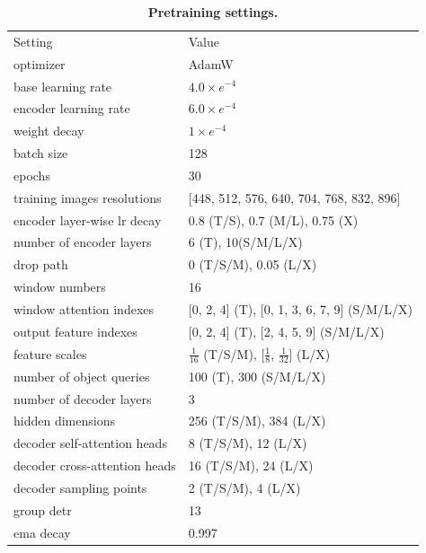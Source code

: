 \documentclass[runningheads]{llncs}
\begin{document}
\begin{table}
  \centering
    \setlength{\tabcolsep}{3.2pt}
    \renewcommand{\arraystretch}{1.41}
    \tiny
  \caption{\textbf{Pretraining settings.}}
  \vspace{-3mm}
  \begin{tabular}{l|l}
    Setting  & Value\\
    \shline
    optimizer & AdamW \\
    base learning rate & $4.0\times e^{-4}$ \\
    encoder learning rate & $6.0\times e^{-4}$ \\
    weight decay & $1\times e^{-4}$ \\
    batch size & 128 \\
    epochs & 30 \\
    training images resolutions & [448, 512, 576, 640, 704, 768, 832, 896] \\
    encoder layer-wise lr decay & 0.8 (T/S), 0.7 (M/L), 0.75 (X) \\
    number of encoder layers & 6 (T), 10(S/M/L/X) \\
    drop path & 0 (T/S/M), 0.05 (L/X) \\
    window numbers & 16 \\
    window attention indexes & [0, 2, 4] (T), [0, 1, 3, 6, 7, 9] (S/M/L/X) \\
    output feature indexes & [0, 2, 4] (T), [2, 4, 5, 9] (S/M/L/X) \\
    feature scales & $\frac{1}{16}$ (T/S/M), [$\frac{1}{8}$, $\frac{1}{32}$] (L/X) \\
    number of object queries & 100 (T), 300 (S/M/L/X) \\
    number of decoder layers & 3 \\
    hidden dimensions & 256 (T/S/M), 384 (L/X) \\
    decoder self-attention heads & 8 (T/S/M), 12 (L/X) \\
    decoder cross-attention heads & 16 (T/S/M), 24 (L/X) \\
    decoder sampling points & 2 (T/S/M), 4 (L/X) \\
    group detr & 13 \\
    ema decay & 0.997
  \end{tabular}
  \label{tab:pretrainingsettings}
  \vspace{-3mm}
\end{table}
\end{document}
